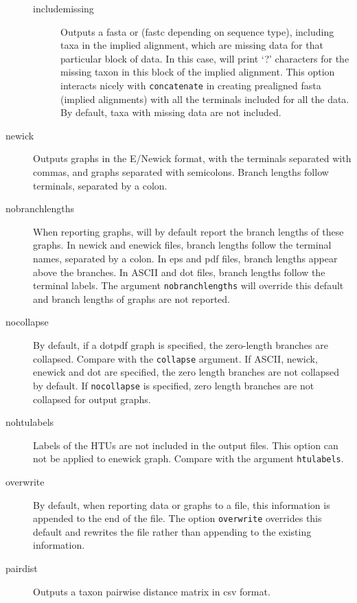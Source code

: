 \begin{description}
\begin{description}
			\item[includemissing] Outputs a fasta or (fastc depending on sequence type), 
			including taxa in the implied
			alignment, which are missing data for that particular block of data.
			In this case, \phyg will print `?' characters for the missing taxon in 
			this block of the implied alignment. This option interacts nicely with 
			\texttt{concatenate} in creating prealigned fasta (implied alignments) 
			with all the terminals included for all the data. By default, taxa with 
			missing data are not included.
			
		\end{description}
				
		\item[newick] Outputs graphs in the E/Newick format, with the terminals
		separated with commas, and graphs separated with semicolons. Branch
		lengths follow terminals, separated by a colon.
		
		\item[nobranchlengths] When reporting graphs, \phyg will by default 
		report the branch lengths of these graphs. In newick and enewick files, 
		branch lengths follow the terminal names, separated by a colon. In eps 
		and pdf files, branch lengths appear above the branches. In ASCII and 
		dot files, branch lengths follow the terminal labels. The argument
		\texttt{nobranchlengths} will override this default and branch lengths 
		of graphs are not reported.
		
		\item[nocollapse] By default, if a dotpdf graph is specified, the zero-length
		branches are collapsed. Compare with the \texttt{collapse} argument. If 
		ASCII, newick, enewick and dot are specified, the zero length branches are 
		not collapsed by default.  If \texttt{nocollapse} is specified, zero length branches 
		are not collapsed for output graphs.
		
		\item[nohtulabels] Labels of the HTUs are not included in the output files. 
		This option can not be applied to enewick graph. Compare with the argument 
		\texttt{htulabels}.
		
		\item[overwrite] By default, when reporting data or graphs to a file, this 
		information is appended to the end of the file. The option \texttt{overwrite} 
		overrides this default and rewrites the file rather than appending to the 
		existing information.

		\item[pairdist] Outputs a taxon pairwise distance matrix in csv format. 
		

\end{description}
